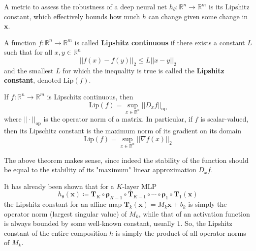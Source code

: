 \documentclass{article}
\begin{document}
      A metric to assess the robustness of a deep neural net $h_\theta: \mathbb{R}^n \longrightarrow \mathbb{R}^m$ is its Lipshitz constant, which effectively bounds how much $h$ can change given some change in $\mathbf{x}$. 

      \begin{definition}
      A function $f: \mathbb{R}^n \longrightarrow \mathbb{R}^m$ is called \textbf{Lipshitz continuous} if there exists a constant $L$ such that for all $x, y \in \mathbb{R}^n$
      \[||f(x) - f(y)||_2 \leq L ||x - y||_2\]
      and the smallest $L$ for which the inequality is true is called the \textbf{Lipshitz constant}, denoted $\mathrm{Lip}(f)$. 
      \end{definition}

      \begin{theorem}
      If $f: \mathbb{R}^n \longrightarrow \mathbb{R}^m$ is Lipschitz continuous, then 
      \[\mathrm{Lip}(f) = \sup_{x \in \mathbb{R}^n} ||D_x f||_{\mathrm{op}}\]
      where $||\cdot ||_{\mathrm{op}}$ is the operator norm of a matrix. In particular, if $f$ is scalar-valued, then its Lipschitz constant is the maximum norm of its gradient on its domain 
      \[\mathrm{Lip}(f) = \sup_{x \in \mathbb{R}^n} ||\nabla f(x)||_2\]
      \end{theorem}

      The above theorem makes sense, since indeed the stability of the function should be equal to the stability of its "maximum" linear approximation $D_x f$. 

      \begin{theorem}
      It has already been shown that for a $K$-layer MLP
      \[h_\theta (\mathbf{x}) \coloneqq \mathbf{T}_K \circ \boldsymbol{\rho}_{K-1} \circ \mathbf{T}_{K-1} \circ \cdots \circ \boldsymbol{\rho}_1 \circ \mathbf{T}_1 (\mathbf{x})\]
      the Lipshitz constant for an affine map $\mathbf{T}_k (\mathbf{x}) = M_k \mathbf{x} + b_k$ is simply the operator norm (largest singular value) of $M_k$, while that of an activation function is always bounded by some well-known constant, usually $1$. So, the Lipshitz constant of the entire composition $h$ is simply the product of all operator norms of $M_k$. 
      \end{theorem}
\end{document}
